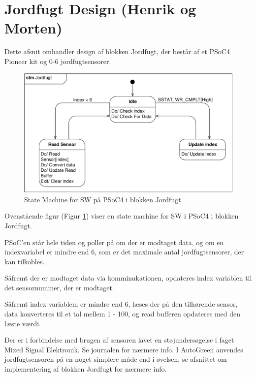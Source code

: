 \section{Jordfugt Design (Henrik og Morten)}

Dette afsnit omhandler design af blokken Jordfugt, der består af et PSoC4 Pioneer kit og 0-6 jordfugtsensorer. 

\begin{figure}[h]
\centering 
\includegraphics[width={\textwidth}, trim=0 0 0 0, clip=true] {../fig/stm_jordfugt.pdf}
\caption{State Machine for SW på PSoC4 i blokken Jordfugt}
\label{fig:stm_jordfugt}
\end{figure}

Ovenstående figur (Figur \ref{fig:stm_jordfugt}) viser en state machine for SW i PSoC4 i blokken Jordfugt.
 
PSoC'en står hele tiden og poller på om der er modtaget data, og om en indexvariabel er mindre end 6, som er det maximale antal jordfugtsensorer, der kan tilkobles.

Såfremt der er modtaget data via \IIC komminukationen, opdateres index variablen til det sensornummer, der er modtaget. 

Såfremt index variablem er mindre end 6, læses der på den tilhørende sensor, data konverteres til et tal mellem 1 - 100, og read bufferen opdateres med den læste værdi. 
\newline

Der er i forbindelse med brugen af sensoren lavet en støjundersøgelse i faget Mixed Signal Elektronik. 
Se journalen \cite{lib:MSE_06} for nærmere info. 
I AutoGreen anvendes jordfugtsensoren på en noget simplere måde end i øvelsen, se afsnittet om implementering af blokken Jordfugt for nærmere info.

\clearpage